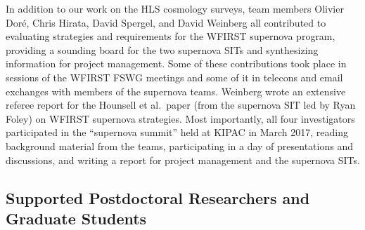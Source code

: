 In addition to our work on the HLS cosmology surveys,
team members Olivier Dor\'e, Chris Hirata, David Spergel,
and David Weinberg all contributed to evaluating strategies and
requirements for the WFIRST supernova program, providing a
sounding board for the two supernova SITs and synthesizing
information for project management.  Some of these contributions
took place in sessions of the WFIRST FSWG meetings and some
of it in telecons and email exchanges with members of the
supernova teams.  Weinberg wrote an extensive referee report
for the Hounsell et al.\ paper (from the supernova SIT led by
Ryan Foley) on WFIRST supernova strategies.  Most importantly,
all four investigators participated in the ``supernova summit''
held at KIPAC in March 2017, reading background material from
the teams, participating in a day of presentations and discussions,
and writing a report for project management and the supernova SITs.


\subsection{Supported Postdoctoral Researchers and Graduate Students}

